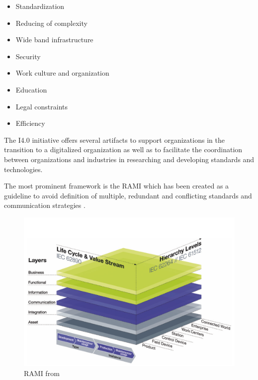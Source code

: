 \begin{itemize}
	\item  Standardization
	\item  Reducing of complexity
	\item  Wide band infrastructure
	\item  Security
	\item  Work culture and organization
	\item  Education
	\item  Legal constraints
	\item  Efficiency
\end{itemize}

The I4.0 initiative offers several artifacts to support organizations in the transition to a digitalized organization as well as to facilitate the coordination between organizations and industries in researching and developing standards and technologies. 

The most prominent framework is the \ac{RAMI} which has been created as a guideline to avoid definition of multiple, redundant and conflicting standards and communication strategies \cite[p. 41]{umsetzungsstrategie:2015}.

\begin{figure}
\centering
\includegraphics[width=1\columnwidth]{images/RAMI}
\caption{\ac{RAMI} from \citeauthor{umsetzungsstrategie:2015} \cite{umsetzungsstrategie:2015}}
\end{figure}

